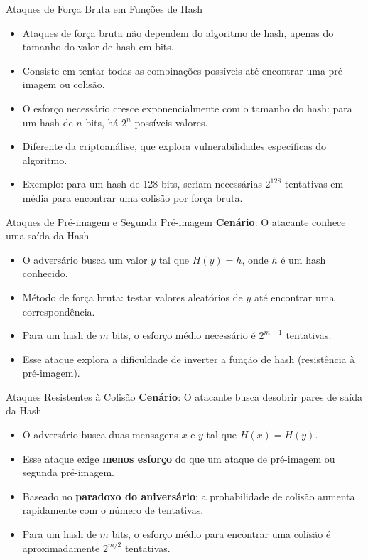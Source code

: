 \begin{frame}{Ataques de Força Bruta em Funções de Hash}
    \begin{itemize}
        \item Ataques de força bruta não dependem do algoritmo de hash, apenas do tamanho do valor de hash em bits.
        \item Consiste em tentar todas as combinações possíveis até encontrar uma pré-imagem ou colisão.
        \item O esforço necessário cresce exponencialmente com o tamanho do hash: para um hash de \(n\) bits, há \(2^n\) possíveis valores.
        \item Diferente da criptoanálise, que explora vulnerabilidades específicas do algoritmo.
        \item Exemplo: para um hash de 128 bits, seriam necessárias \(2^{128}\) tentativas em média para encontrar uma colisão por força bruta.
    \end{itemize}
\end{frame}
\begin{frame}{Ataques de Pré-imagem e Segunda Pré-imagem}
\textbf{Cenário}: O atacante conhece uma saída da Hash
    \begin{itemize}
        \item O adversário busca um valor \(y\) tal que \(H(y) = h\), onde \(h\) é um hash conhecido.
        \item Método de força bruta: testar valores aleatórios de \(y\) até encontrar uma correspondência.
        \item Para um hash de \(m\) bits, o esforço médio necessário é \(2^{m-1}\) tentativas.
        \item Esse ataque explora a dificuldade de inverter a função de hash (resistência à pré-imagem).
    \end{itemize}
\end{frame}
\begin{frame}{Ataques Resistentes à Colisão}
\textbf{Cenário}: O atacante busca desobrir pares de saída da Hash
    \begin{itemize}
        \item O adversário busca duas mensagens \(x\) e \(y\) tal que \(H(x) = H(y)\).
        \item Esse ataque exige \textbf{menos esforço} do que um ataque de pré-imagem ou segunda pré-imagem.
        \item Baseado no \textbf{paradoxo do aniversário}: a probabilidade de colisão aumenta rapidamente com o número de tentativas.
        \item Para um hash de \(m\) bits, o esforço médio para encontrar uma colisão é aproximadamente \(2^{m/2}\) tentativas.
    \end{itemize}
\end{frame}
